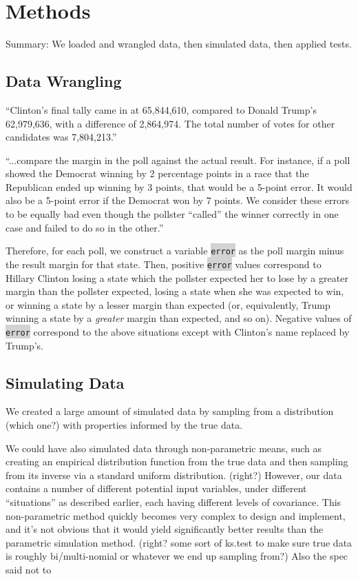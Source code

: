 \documentclass[11pt, oneside]{article}
\newcommand \Rcode[1]{{\texttt{\colorbox{lightgray}{#1}}}}
\begin{document}
\section{Methods}

Summary: We loaded and wrangled data, then simulated data, then applied tests. 

\subsection{Data Wrangling}



``Clinton's final tally came in at 65,844,610, compared to Donald Trump's 62,979,636, with a difference of 2,864,974. The total number of votes for other candidates was 7,804,213.'' \cite{time}

``...compare the margin in the poll against the actual result. For instance, if a poll showed the Democrat winning by 2 percentage points in a race that the Republican ended up winning by 3 points, that would be a 5-point error. It would also be a 5-point error if the Democrat won by 7 points. We consider these errors to be equally bad even though the pollster ``called'' the winner correctly in one case and failed to do so in the other.''
\cite{silver}

Therefore, for each poll, we construct a variable \Rcode{error} as the poll margin minus the result margin for that state. Then, positive \Rcode{error} values correspond to Hillary Clinton losing a state which the pollster expected her to lose by a greater margin than the pollster expected, losing a state when she was expected to win, or winning a state by a lesser margin than expected (or, equivalently, Trump winning a state by a \emph{greater} margin than expected, and so on). Negative values of \Rcode{error} correspond to the above situations except with Clinton's name replaced by Trump's. 

\subsection{Simulating Data}

We created a large amount of simulated data by sampling from a distribution (which one?) with properties informed by the true data. 

We could have also simulated data through non-parametric means, such as creating an empirical distribution function from the true data and then sampling from its inverse via a standard uniform distribution. (right?) However, our data contains a number of different potential input variables, under different ``situations'' as described earlier, each having different levels of covariance. This non-parametric method quickly becomes very complex to design and implement, and it's not obvious that it would yield significantly better results than the parametric simulation method. (right? some sort of ks.test to make sure true data is roughly bi/multi-nomial or whatever we end up sampling from?) Also the spec said not to
\end{document}

